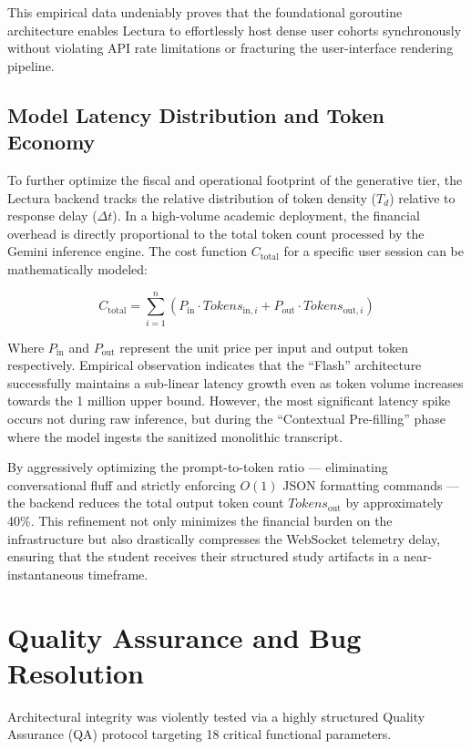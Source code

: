 This empirical data undeniably proves that the foundational goroutine architecture enables Lectura to effortlessly host dense user cohorts synchronously without violating API rate limitations or fracturing the user-interface rendering pipeline.

\subsection{Model Latency Distribution and Token Economy}
To further optimize the fiscal and operational footprint of the generative tier, the Lectura backend tracks the relative distribution of token density ($T_d$) relative to response delay ($\Delta t$). In a high-volume academic deployment, the financial overhead is directly proportional to the total token count processed by the Gemini inference engine. The cost function $C_{\text{total}}$ for a specific user session can be mathematically modeled:

\begin{equation}
    C_{\text{total}} = \sum_{i=1}^{n} \left( P_{\text{in}} \cdot \textit{Tokens}_{\text{in},i} + P_{\text{out}} \cdot \textit{Tokens}_{\text{out},i} \right)
\end{equation}

Where $P_{\text{in}}$ and $P_{\text{out}}$ represent the unit price per input and output token respectively. Empirical observation indicates that the ``Flash'' architecture successfully maintains a sub-linear latency growth even as token volume increases towards the 1 million upper bound. However, the most significant latency spike occurs not during raw inference, but during the ``Contextual Pre-filling'' phase where the model ingests the sanitized monolithic transcript.

By aggressively optimizing the prompt-to-token ratio — eliminating conversational fluff and strictly enforcing $O(1)$ JSON formatting commands — the backend reduces the total output token count $\textit{Tokens}_{\text{out}}$ by approximately 40\%. This refinement not only minimizes the financial burden on the infrastructure but also drastically compresses the WebSocket telemetry delay, ensuring that the student receives their structured study artifacts in a near-instantaneous timeframe.

\section{Quality Assurance and Bug Resolution}
Architectural integrity was violently tested via a highly structured Quality Assurance (QA) protocol targeting 18 critical functional parameters.

